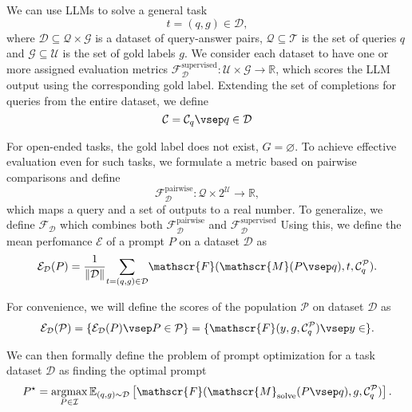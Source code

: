 We can use LLMs to solve a general task
\begin{equation}
    t = (q, g) \in \mathcal{D},
\end{equation}
where $\mathcal{D} \subseteq \mathcal{Q} \times \mathcal{G}$ is a dataset of query-answer pairs, $\mathcal{Q}\subseteq\mathcal{T}$ is the set of queries $q$
and $\mathcal{G}\subseteq\mathcal{U}$ is the set of gold labels $g$.
We consider each dataset to have one or more assigned evaluation metrics $\mathscr{F}_{\mathcal{D}}^{\text{supervised}}: \mathcal{U} \times \mathcal{G} \rightarrow \mathbb{R}$,
which scores the LLM output using the corresponding gold label. 
Extending the set of completions for queries from the entire dataset, we define
\begin{equation}
    \mathcal{C} = {\mathcal{C}_{q}\vsep q \in \mathcal{D}}
\end{equation}

For open-ended tasks, the gold label does not exist, $G = \varnothing$. To achieve effective evaluation even for such tasks, 
we formulate a metric based on pairwise comparisons and define
\begin{equation}
    \mathscr{F}_{\mathcal{D}}^{\text{pairwise}}: \mathcal{Q} \times 2^\mathcal{U} \rightarrow \mathbb{R},
\end{equation}
which maps a query and a set of outputs to a real number. 
To generalize, we define $\mathscr{F}_{\mathcal{D}}$ which combines both $\mathscr{F}_{\mathcal{D}}^{\text{pairwise}}$ and $\mathscr{F}_{\mathcal{D}}^{\text{supervised}}$
Using this, we define the mean perfomance $\mathcal{E}$ of a prompt $P$ on a dataset $\mathcal{D}$ as
\begin{equation}
    \mathcal{E}_{\mathcal{D}}(P) = \frac{1}{\Vert \mathcal{D} \Vert}\underset{t=(q,g)\in \mathcal{D}}{\sum}\mathscr{F}(\mathscr{M}(P\vsep q), t, \mathcal{C}_{q}^{\mathcal{P}}).
\end{equation}

For convenience, we will define the scores of the population $\mathcal{P}$ on dataset $\mathcal{D}$ as
\begin{equation}
    \mathcal{E}_{\mathcal{D}}(\mathcal{P}) = \{\mathcal{E}_{\mathcal{D}}(P)\vsep P\in \mathcal{P}\} = \{\mathscr{F}(y, g, \mathcal{C}_{q}^{\mathcal{P}})\vsep y \in \}.
\end{equation}

We can then formally define the problem of prompt optimization for a task dataset $\mathcal{D}$ as finding the optimal prompt 
\begin{equation}
    \label{eq:optimdef}
    P^{\star} = \underset{P\in\mathcal{I}}{\operatorname{argmax}}\,\mathbb{E}_{(q, g) \sim \mathcal{D}}\left[\mathscr{F}(\mathscr{M}_{\text{solve}}(P \vsep q), g, \mathcal{C}_{q}^{\mathcal{P}})\right].
\end{equation}

